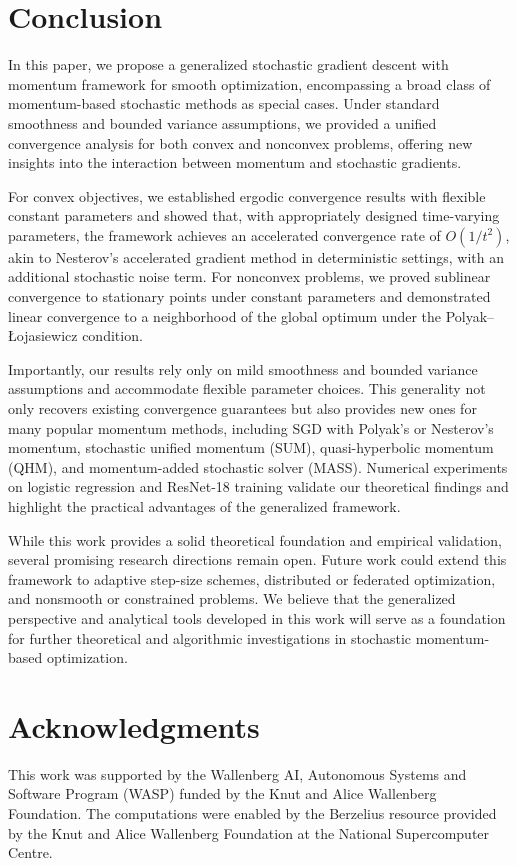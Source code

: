 \documentclass[10pt]{article}
\numberwithin{equation}{section}
\theoremstyle{definition}
\begin{document}
\section{Conclusion}
\label{sec:conclusion}
In this paper, we propose a generalized stochastic gradient descent with momentum framework for smooth optimization, encompassing a broad class of momentum-based stochastic methods as special cases. Under standard smoothness and bounded variance assumptions, we provided a unified convergence analysis for both convex and nonconvex problems, offering new insights into the interaction between momentum and stochastic gradients.

For convex objectives, we established ergodic convergence results with flexible constant parameters and showed that, with appropriately designed time-varying parameters, the framework achieves an accelerated convergence rate of $O(1/t^2)$, akin to Nesterov's accelerated gradient method in deterministic settings, with an additional stochastic noise term. For nonconvex problems, we proved sublinear convergence to stationary points under constant parameters and demonstrated linear convergence to a neighborhood of the global optimum under the Polyak–\L{}ojasiewicz condition.

Importantly, our results rely only on mild smoothness and bounded variance assumptions and accommodate flexible parameter choices. This generality not only recovers existing convergence guarantees but also provides new ones for many popular momentum methods, including SGD with Polyak's or Nesterov's momentum, stochastic unified momentum (SUM), quasi-hyperbolic momentum (QHM), and momentum-added stochastic solver (MASS). Numerical experiments on logistic regression and ResNet-18 training validate our theoretical findings and highlight the practical advantages of the generalized framework.

While this work provides a solid theoretical foundation and empirical validation, several promising research directions remain open. Future work could extend this framework to adaptive step-size schemes, distributed or federated optimization, and nonsmooth or constrained problems. We believe that the generalized perspective and analytical tools developed in this work will serve as a foundation for further theoretical and algorithmic investigations in stochastic momentum-based optimization.

\section*{Acknowledgments}

This work was supported by the Wallenberg AI, Autonomous Systems and Software Program (WASP) funded by the Knut and Alice Wallenberg Foundation. The computations were enabled by the Berzelius resource provided by the Knut and Alice Wallenberg Foundation at the National Supercomputer Centre. 

%
%
%
%
%
%
%

\setlength{\bibsep}{0.111cm}

%

\end{document}
